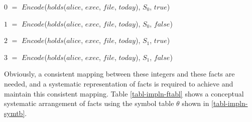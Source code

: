 \documentclass[11pt]{report}
\newenvironment{vquote}
{
  \begin{list}{}{\leftmargin 1em}\item[]
}
{
  \end{list}
}
\begin{document}
        \begin{vquote}
          $0$ $=$ $Encode$($holds$($alice$, $exec$, $file$, $today$), $S_0$, $true$)

          $1$ $=$ $Encode$($holds$($alice$, $exec$, $file$, $today$), $S_0$, $false$)

          $2$ $=$ $Encode$($holds$($alice$, $exec$, $file$, $today$), $S_1$, $true$)

          $3$ $=$ $Encode$($holds$($alice$, $exec$, $file$, $today$), $S_1$, $false$)
        \end{vquote}

        Obviously, a consistent mapping between these integers and these
        facts are needed, and a systematic representation of facts is
        required to achieve and maintain this consistent mapping. Table
        \ref{tabl-impln-ftabl} shows a conceptual systematic arrangement of
        facts using the symbol table $\theta$ shown in
        \ref{tabl-impln-symtb}.
\end{document}
